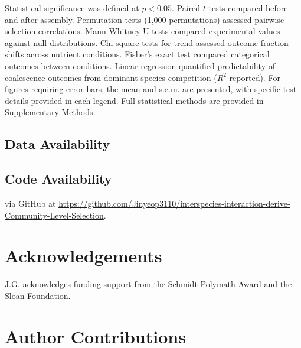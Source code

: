 Statistical significance was defined at $p < 0.05$.  Paired $t$-tests compared  before and after assembly. Permutation tests (1,000 permutations) assessed pairwise selection correlations. Mann-Whitney U tests compared experimental values against null distributions. Chi-square tests for trend assessed outcome fraction shifts across nutrient conditions. Fisher's exact test compared categorical outcomes between conditions. Linear regression quantified predictability of coalescence outcomes from dominant-species competition ($R^2$ reported). For figures requiring error bars, the mean and s.e.m. are presented, with specific test details provided in each legend. Full statistical methods are provided in Supplementary Methods.


\subsection*{Data Availability}
\label{sec:methods:data}



\subsection*{Code Availability}
\label{sec:methods:code}

 via GitHub at \url{https://github.com/Jinyeop3110/interspecies-interaction-derive-Community-Level-Selection}.



\section*{Acknowledgements}
\label{sec:acknowledgements}

J.G. acknowledges funding support from the Schmidt Polymath Award and the Sloan Foundation.


\section*{Author Contributions}
\label{sec:contributions}

